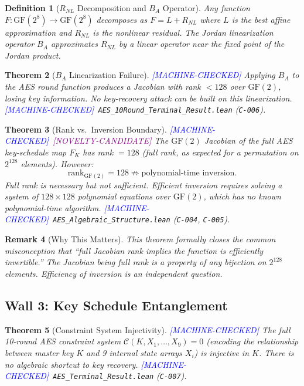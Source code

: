 \documentclass[11pt,letterpaper]{article}
\newtheorem{theorem}{Theorem}[section]
\newtheorem{definition}[theorem]{Definition}
\newtheorem{remark}[theorem]{Remark}
\newcommand{\MC}{\textcolor{blue}{[MACHINE-CHECKED]}}
\newcommand{\CN}{\textcolor{purple}{[NOVELTY-CANDIDATE]}}
\begin{document}
\begin{definition}[$R_{NL}$ Decomposition and $B_A$ Operator]
Any function $F: \mathrm{GF}(2^8) \to \mathrm{GF}(2^8)$ decomposes as
$F = L + R_{NL}$ where $L$ is the best affine approximation and $R_{NL}$
is the nonlinear residual.  The Jordan linearization operator $B_A$ approximates
$R_{NL}$ by a linear operator near the fixed point of the Jordan product.
\end{definition}

\begin{theorem}[$B_A$ Linearization Failure] \MC
Applying $B_A$ to the AES round function produces a Jacobian with rank
$< 128$ over $\mathrm{GF}(2)$, losing key information.  No key-recovery attack
can be built on this linearization.
\MC\ \texttt{AES\_10Round\_Terminal\_Result.lean} (\texttt{C-006}).
\end{theorem}

\begin{theorem}[Rank vs.\ Inversion Boundary] \MC\ \CN
The $\mathrm{GF}(2)$ Jacobian of the full AES key-schedule map $F_K$ has
rank $= 128$ (full rank, as expected for a permutation on $2^{128}$ elements).
However:
\[
\mathrm{rank}_{\mathrm{GF}(2)} = 128 \not\Rightarrow \text{polynomial-time inversion.}
\]
Full rank is necessary but not sufficient.  Efficient inversion requires
solving a system of $128 \times 128$ polynomial equations over $\mathrm{GF}(2)$,
which has no known polynomial-time algorithm.
\MC\ \texttt{AES\_Algebraic\_Structure.lean} (\texttt{C-004}, \texttt{C-005}).
\end{theorem}

\begin{remark}[Why This Matters]
This theorem formally closes the common misconception that ``full Jacobian
rank implies the function is efficiently invertible.''  The Jacobian being
full rank is a property of any bijection on $2^{128}$ elements.  Efficiency
of inversion is an independent question.
\end{remark}

\subsection{Wall 3: Key Schedule Entanglement}

\begin{theorem}[Constraint System Injectivity] \MC
The full 10-round AES constraint system
$\mathcal{C}(K, X_1, \ldots, X_9) = 0$
(encoding the relationship between master key $K$ and 9 internal state
arrays $X_i$) is injective in $K$.  There is no algebraic shortcut to
key recovery.
\MC\ \texttt{AES\_Terminal\_Result.lean} (\texttt{C-007}).
\end{theorem}
\end{document}
